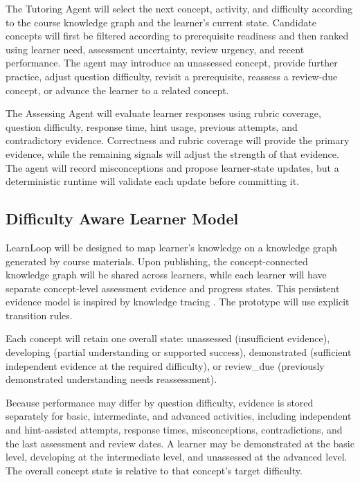 \documentclass{article}
\begin{document}
The Tutoring Agent will select the next concept, activity, and difficulty according to the course knowledge graph and the learner's current state. Candidate concepts will first be filtered according to prerequisite readiness and then ranked using learner need, assessment uncertainty, review urgency, and recent performance. The agent may introduce an unassessed concept, provide further practice, adjust question difficulty, revisit a prerequisite, reassess a review-due concept, or advance the learner to a related concept.

The Assessing Agent will evaluate learner responses using rubric coverage, question difficulty, response time, hint usage, previous attempts, and contradictory evidence. Correctness and rubric coverage will provide the primary evidence, while the remaining signals will adjust the strength of that evidence. The agent will record misconceptions and propose learner-state updates, but a deterministic runtime will validate each update before committing it.

\subsection{Difficulty Aware Learner Model}

LearnLoop will be designed to map learner's knowledge on a knowledge graph generated by course materials. Upon publishing, the concept-connected knowledge graph will be shared across learners, while each learner will have separate concept-level assessment evidence and progress states. This persistent evidence model is inspired by knowledge tracing \citep{ref5}. The prototype will use explicit transition rules.

Each concept will retain one overall state: unassessed (insufficient evidence), developing (partial understanding or supported success), demonstrated (sufficient independent evidence at the required difficulty), or review\_due (previously demonstrated understanding needs reassessment).

Because performance may differ by question difficulty, evidence is stored separately for basic, intermediate, and advanced activities, including independent and hint-assisted attempts, response times, misconceptions, contradictions, and the last assessment and review dates. A learner may be demonstrated at the basic level, developing at the intermediate level, and unassessed at the advanced level. The overall concept state is relative to that concept's target difficulty.
\end{document}
